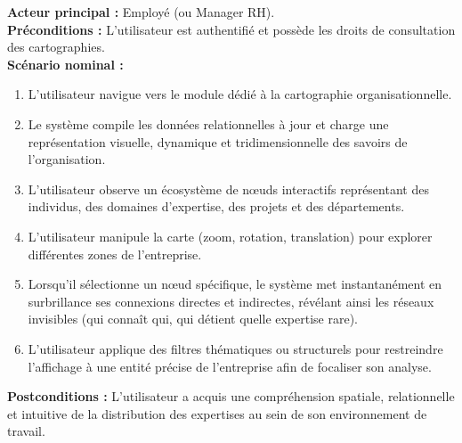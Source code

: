 \documentclass[12pt,a4paper]{article}
\begin{document}
\begin{tcolorbox}[colback=bleu!5,colframe=bleu,title=Cas d'utilisation 2 : Visualisation de la carte des connaissances]
\textbf{Acteur principal :} Employé (ou Manager RH). \\
\textbf{Préconditions :} L'utilisateur est authentifié et possède les droits de consultation des cartographies. \\
\textbf{Scénario nominal :}
\begin{enumerate}
    \item L'utilisateur navigue vers le module dédié à la cartographie organisationnelle.
    \item Le système compile les données relationnelles à jour et charge une représentation visuelle, dynamique et tridimensionnelle des savoirs de l'organisation.
    \item L'utilisateur observe un écosystème de nœuds interactifs représentant des individus, des domaines d'expertise, des projets et des départements.
    \item L'utilisateur manipule la carte (zoom, rotation, translation) pour explorer différentes zones de l'entreprise.
    \item Lorsqu'il sélectionne un nœud spécifique, le système met instantanément en surbrillance ses connexions directes et indirectes, révélant ainsi les réseaux invisibles (qui connaît qui, qui détient quelle expertise rare).
    \item L'utilisateur applique des filtres thématiques ou structurels pour restreindre l'affichage à une entité précise de l'entreprise afin de focaliser son analyse.
\end{enumerate}
\textbf{Postconditions :} L'utilisateur a acquis une compréhension spatiale, relationnelle et intuitive de la distribution des expertises au sein de son environnement de travail.
\end{tcolorbox}
\end{document}
